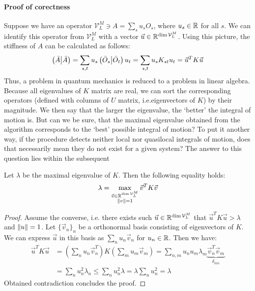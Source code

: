 \paragraph{Proof of corectness}
Suppose we have an operator \(\mathcal{V}_L^M \ni A = \sum_s u_s O_s \), where \(u_s \in \mathbb{R} \) for all \(s\).
We can identify this operator from \(\mathcal{V}_L^M\) with a vector \( \vec{u} \in \mathbb{R}^{\dim{\mathcal{V}_L^M}}\). Using this picture,
the stiffness of \(A\) can be calculated as follows:
\begin{equation}
  \left(\bar{A} \middle| \bar{A}\right) = \sum_{s,t} u_s \left(\bar{O}_s \middle| \bar{O}_t\right) u_t = \sum_{s,t} u_s K_{st} u_t = 
   \vec{u}^{T} K \vec{u}  
\end{equation} 
Thus, a problem in quantum mechanics is reduced to a problem in linear algebra.
Because all eigenvalues of \(K\) matrix are real, we can sort the corresponding operators (defined with columns of \(U\) matrix,
i.e.\;eigenvectors of \(K\)) by their magnitude. We then say that the larger the eigenvalue, the `better' the integral of motion is.
But can we be sure, that the maximal eigenvalue obtained from the algorithm corresponds to the `best' possible integral of motion?
To put it another way, if the procedure detects neither local nor quasilocal integrals of motion, does that necessarily mean they
do not exist for a given system? The answer to this question lies within the subsequent
\begin{proposition}
Let \(\lambda \) be the maximal eigenvalue of \(K\). Then the following equality holds:
\begin{equation*}
  \lambda = \max_{  \substack{\vec{v}\in \mathbb{R}^{\dim{\mathcal{V}_L^M}}\\\norm{v} = 1}  }{\vec{v}^{T} K \vec{v}}
\end{equation*}
\end{proposition}
\begin{proof}
  Assume the converse, i.e. there exists such \(\vec{u} \in \mathbb{R}^{\dim{\mathcal{V}_L^M}}\) that \(\vec{u}^T K \vec{u} > \lambda\)
  and \(\norm{u} = 1\).
  Let \(\{\vec{v}_n\}_n\) be a orthonormal basis consisting of eigenvectors of \(K\). We can express \(\vec{u}\) in this basis as
  \(\sum_n u_n \vec{v}_n\) for \(u_n \in \mathbb{R}\). Then we have:
  \begin{align*}    
    \vec{u}^T K \vec{u} &= \left( \sum_n u_n \vec{v}_n^{T} \right) K  \left( \sum_m u_m \vec{v}_m \right) 
    = \sum_{n,m} u_n u_m \lambda_m \underbrace{\vec{v}_n^{T} \vec{v}_m}_{\delta_{mn}} \\
    &= \sum_n u_n^2 \lambda_n \leq \sum_n u_n^2 \lambda = \lambda \sum_n u_n^2 = \lambda   
  \end{align*}
  Obtained contradiction concludes the proof.
\end{proof}

